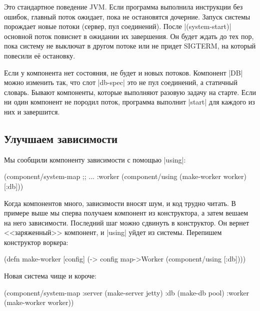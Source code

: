 Это стандартное поведение JVM. Если программа выполнила инструкции без ошибок,
главный поток ожидает, пока не остановятся дочерние. Запуск системы порождает
новые потоки (сервер, пул соединений). После \spverb|(system-start)| основной
поток повиснет в ожидании их завершения. Он будет ждать до тех пор, пока систему
не выключат в другом потоке или не придет SIGTERM, на который повесили е\"{е}
остановку.

Если у компонента нет состояния, не будет и новых потоков. Компонент \spverb|DB|
можно изменить так, что слот \spverb|db-spec| это не пул соединений, а статичный
словарь. Бывают компоненты, которые выполняют разовую задачу на старте. Если ни
один компонент не породил поток, программа выполнит \spverb|start| для каждого
из них и завершится.

\subsection{Улучшаем зависимости}

Мы сообщили компоненту зависимости с помощью \spverb|using|:

\begin{english}
  \begin{clojure}
(component/system-map
 ;; ...
 :worker (component/using
          (make-worker worker) [:db]))
  \end{clojure}
\end{english}

Когда компонентов много, зависимости вносят шум, и код трудно читать. В примере
выше мы сперва получаем компонент из конструктора, а затем вешаем на него
зависимости. Последний шаг можно сдвинуть в конструктор. Он вернет
<<заряженный>> компонент, и \spverb|using| уйдет из системы. Перепишем
конструктор воркера:

\begin{english}
  \begin{clojure}
(defn make-worker [config]
  (-> config
      map->Worker
      (component/using [:db])))
  \end{clojure}
\end{english}

\noindent
Новая система чище и короче:

\begin{english}
  \begin{clojure}
(component/system-map
 :server (make-server jetty)
 :db     (make-db pool)
 :worker (make-worker worker))
  \end{clojure}
\end{english}

